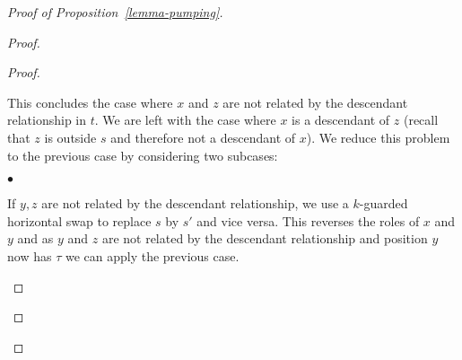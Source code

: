 \begin{proof}[Proof of Proposition~\ref{lemma-pumping}]
\begin{proof}
\begin{proof}
\begin{enumerate}[(1)]
\begin{center}
\end{center}


\end{enumerate}

\bigskip 

This concludes the case where $x$ and $z$ are not related by the descendant
relationship in $t$. We are left with the case where $x$ is a descendant of
$z$ (recall that $z$ is outside $s$ and therefore not a descendant of $x$).
We reduce this problem to the previous case by considering two subcases:

\begin{iteMize}{$\bullet$}

\item If $y,z$ are not related by the descendant relationship, we use a
  $k$-guarded horizontal swap to replace $s$ by $s'$ and vice versa. This
  reverses the roles of $x$ and $y$ and as $y$ and $z$ are not related by
  the descendant relationship and position $y$ now has  $\tau$
  we can apply the previous case.

\begin{center}
\end{center}
\end{iteMize}
\end{proof}
\end{proof}
\end{proof}
